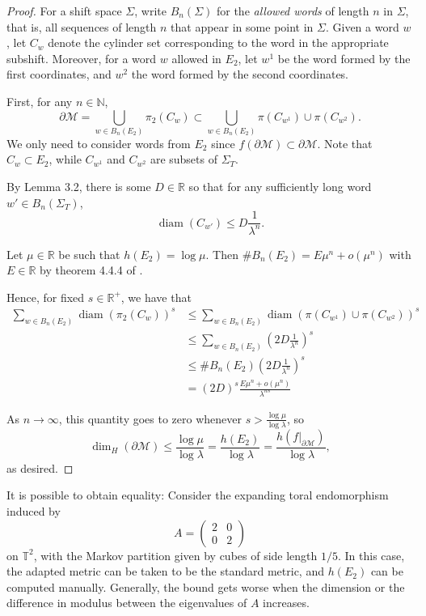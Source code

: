 \documentclass{article}
\def\N{\mathbb{N}}
\def\R{\mathbb{R}}
\def\T{\mathbb{T}}
\def\M{\mathcal{M}}
\begin{document}
\begin{proof} 

For a shift space $\Sigma$, write $B_n(\Sigma)$ for the \textit{allowed words} of length $n$ in $\Sigma$, that is, all sequences of length $n$ that appear in some point in $\Sigma$. Given a word $w$, let $C_w$ denote the cylinder set corresponding to the word in the appropriate subshift. Moreover, for a word $w$ allowed in $E_2$, let $w^1$ be the word formed by the first coordinates, and $w^2$ the word formed by the second coordinates.

First, for any $n\in \N$, 
$$\partial \M = \bigcup_{w\in B_n(E_2)} \pi_2(C_w) \subset \bigcup_{w\in B_n(E_2)} \pi(C_{w^1})\cup \pi(C_{w^2}).$$ We only need to consider words from $E_2$ since $f(\partial \M)\subset \partial \M$. Note that $C_w\subset E_2$, while $C_{w^1}$ and $C_{w^2}$ are subsets of $\Sigma_T$. 

By \cite{AKS} Lemma 3.2, there is some $D\in \R$ so that for any sufficiently long word $w'\in B_n(\Sigma_T)$, $$\operatorname{diam}(C_{w'}) \leq D \frac{1}{\lambda^n}.$$ 

Let $\mu\in \R$ be such that $h(E_2)=\log\mu$. Then $\# B_n(E_2) = E\mu^n + o(\mu^n)$ with $E\in \R$ by theorem 4.4.4 of \cite{LM}.


Hence, for fixed $s\in \R^+$, we have that \begin{align*}
\sum_{w\in B_n(E_2)} \operatorname{diam}(\pi_2(C_w))^s &\leq \sum_{w\in B_n(E_2)}\operatorname{diam}(\pi(C_{w^1})\cup \pi(C_{w^2}))^s \\
&\leq\sum_{w\in B_n(E_2)}\left(2D \frac{1}{\lambda^n}\right)^s  \\
&\leq \#B_n(E_2) \left(2D \frac{1}{\lambda^n}\right)^s \\
&= (2D)^s\frac{E\mu^n+o(\mu^n)}{\lambda^{ns}}
\end{align*}

As $n\to \infty$, this quantity goes to zero whenever $s>\frac{\log\mu}{\log\lambda}$, so $$\dim_H(\partial\M)\leq \frac{\log\mu}{\log\lambda} = \frac{h(E_2)}{\log\lambda}=\frac{h(f|_{\partial\M})}{\log\lambda},$$ as desired.

\end{proof}




It is possible to obtain equality: Consider the expanding toral endomorphism induced by $$A=\begin{pmatrix}
    2 & 0 \\ 0 & 2
\end{pmatrix}$$ on $\T^2$, with the Markov partition given by cubes of side length $1/5$. In this case, the adapted metric can be taken to be the standard metric, and $h(E_2)$ can be computed manually. Generally, the bound gets worse when the dimension or the difference in modulus between the eigenvalues of $A$ increases. 
\end{document}
